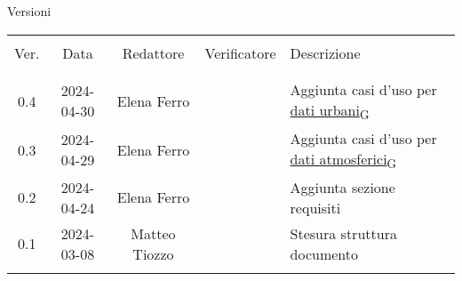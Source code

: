 \documentclass[12pt]{article}
\begin{document}


\newpage



\captionsetup[table]{list=no}
\begin{table}[!h]
	\footnotesize
	\begin{center}
		Versioni\\
		\vspace{0.5cm}
		\begin{tabular}{ c c c c p{6.1cm} }
			\hline                                                                                      \\[-2ex]
			Ver. & Data       & Redattore     & Verificatore & Descrizione                              \\
			\\[-2ex] \hline \\[-1.5ex]
			0.4  & 2024-04-30 & Elena Ferro   &              & Aggiunta casi d'uso per \href{https://7last.github.io/docs/rtb/documentazione-interna/glossario\#dati-urbani}{dati urbani\textsubscript{G}}      \\
			0.3  & 2024-04-29 & Elena Ferro   &              & Aggiunta casi d'uso per \href{https://7last.github.io/docs/rtb/documentazione-interna/glossario\#dati-atmosferici}{dati atmosferici\textsubscript{G}} \\
			0.2  & 2024-04-24 & Elena Ferro   &              & Aggiunta sezione requisiti               \\
			0.1  & 2024-03-08 & Matteo Tiozzo &              & Stesura struttura documento              \\
			\\[-1.5ex] \hline
		\end{tabular}
	\end{center}
\end{table}
\captionsetup[table]{list=yes}

\newpage

\tableofcontents
\listoftables

\newpage








\end{document}
